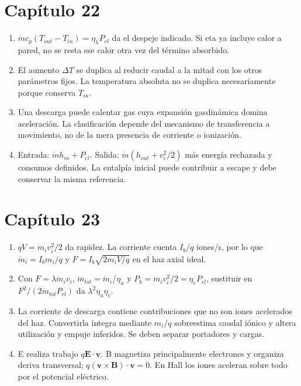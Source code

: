 \section*{Capítulo 22}
\begin{enumerate}
\item $\dot mc_p(T_{out}-T_{in})=\eta_hP_{el}$ da el despeje indicado. Si eta ya incluye calor a pared, no se resta ese calor otra vez del término absorbido.
\item El aumento $\Delta T$ se duplica al reducir caudal a la mitad con los otros parámetros fijos. La temperatura absoluta no se duplica necesariamente porque conserva $T_{in}$.
\item Una descarga puede calentar gas cuya expansión gasdinámica domina aceleración. La clasificación depende del mecanismo de transferencia a movimiento, no de la mera presencia de corriente o ionización.
\item Entrada: $\dot mh_{in}+P_{el}$. Salida: $\dot m(h_{out}+v_e^2/2)$ más energía rechazada y consumos definidos. La entalpía inicial puede contribuir a escape y debe conservar la misma referencia.
\end{enumerate}
\section*{Capítulo 23}
\begin{enumerate}
\item $qV=m_iv_i^2/2$ da rapidez. La corriente cuenta $I_b/q$ iones/s, por lo que $\dot m_i=I_bm_i/q$ y $F=I_b\sqrt{2m_iV/q}$ en el haz axial ideal.
\item Con $F=\lambda\dot m_iv_i$, $\dot m_{tot}=\dot m_i/\eta_u$ y $P_b=\dot m_iv_i^2/2=\eta_eP_{el}$, sustituir en $F^2/(2\dot m_{tot}P_{el})$ da $\lambda^2\eta_u\eta_e$.
\item La corriente de descarga contiene contribuciones que no son iones acelerados del haz. Convertirla íntegra mediante $m_i/q$ sobreestima caudal iónico y altera utilización y empuje inferidos. Se deben separar portadores y cargas.
\item E realiza trabajo $q\mathbf E\cdot\mathbf v$. B magnetiza principalmente electrones y organiza deriva transversal; $q(\mathbf v\times\mathbf B)\cdot\mathbf v=0$. En Hall los iones aceleran sobre todo por el potencial eléctrico.
\end{enumerate}
